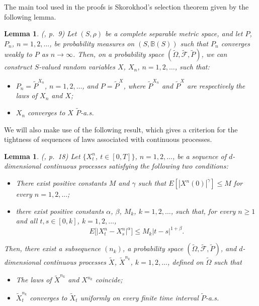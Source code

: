\documentclass[numbers,compress,v1.0.1]{vmsta}
\newtheorem{lemma}[theorem]{Lemma}
\theoremstyle{definition}
\begin{document}
The main tool used in the proofs is Skorokhod's selection theorem given
by the following lemma.
%
\begin{lemma} \textup{(\cite{IW}, p.~9)}
Let $(S,\rho)$ be a complete separable metric space, and let $P$,
$P_n$, $n=1,2,\ldots$, be probability measures on $(S,\mathbb{B}(S))$
such that $P_n$ converges weakly to $P$ as $n \rightarrow\infty$.
Then, on a probability space $(\widetilde{\varOmega}, \widetilde{\mathcal
{F}},\widetilde{P})$, we can construct $S$-valued random variables $X$,
$X_n$, $n=1,2,\ldots$, such that:
%
\begin{itemize}
%
\item[\rm(i)] $P_n = \widetilde{P}^{X_n}$, $n=1,2,\ldots$, and $P =
\widetilde{P}^{X}$, where $\widetilde{P}^{X_n}$ and $\widetilde{P}^{X}$
are respectively the laws of ${X_n}$ and ${X}$;

\item[\rm(ii)] $X_n$ converges to $X$ $\widetilde{P}$-a.s.
\end{itemize}
%
\end{lemma}
%
We will also make use of the following result, which gives a criterion
for the tightness of sequences of laws associated with continuous processes.
%
\begin{lemma} \textup{(\cite{IW}, p.\ 18)} \label{tightness}
Let $\{X_{t}^{n}$, $t\in[0,T]\}$, $n=1,2,\ldots$, be a sequence of
$d$-dimensional continuous processes satisfying the following two conditions:
%
\begin{itemize}
%
\item[\rm(i)] There exist positive constants $M$ and $\gamma$ such that
$E[|X^n(0)|^{\gamma}]\leq M$ for every $n=1,2,\ldots$;
%
\item[\rm(ii)] there exist positive constants $\alpha$, $\beta$, $M_k$,
$k=1,2,\ldots$, such that, for every $n\geq1$ and all $t, s \in[0,k]$,
$k=1,2,\ldots$,
%
\[
E\bigl[\bigl|X_{t}^{n}-X_{s}^{n}\bigr|^{\alpha}
\bigr]\leq M_k |t-s|^{1+\beta}.
\]
%
\end{itemize}
%
Then, there exist a subsequence $(n_k)$, a probability space
$(\widetilde{\varOmega}, \widetilde{\mathcal{F}},\widetilde{P})$, and
$d$-dimen\-sional continuous processes $\widetilde{X}$, $\widetilde
{X}^{n_k}$, $k=1,2,\ldots$, defined on $\widetilde{\varOmega}$ such that
%
\begin{itemize}
%
\item[\rm(1)] The laws of $\widetilde{X}^{n_k}$ and $X^{n_k}$ coincide;
%
\item[\rm(2)] $\widetilde{X}^{n_k}_{t}$ converges to $\widetilde
{X}_{t}$ uniformly on every finite time interval $\widetilde{P}$-a.s.
\end{itemize}
%
\end{lemma}
%
\end{document}
